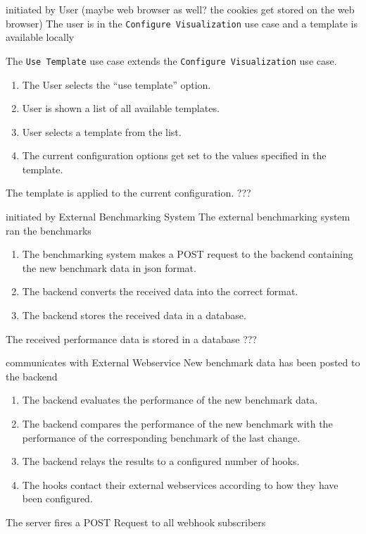 \bigskip

{initiated by User (maybe web browser as well? the cookies get stored on the web browser)}
{The user is in the \texttt{Configure Visualization} use case and a \gls{template} is available locally}
{The \texttt{Use Template} use case extends the \texttt{Configure Visualization} use case.
\begin{enumerate}
    \item The User selects the \enquote{use template} option.
    \item User is shown a list of all available \glspl{template}.
    \item User selects a \gls{template} from the list.
    \item The current \gls{configuration} options get set to the values specified in the template.
\end{enumerate}} 
{The \gls{template} is applied to the current configuration.}
{???}

\bigskip

{initiated by External Benchmarking System}
{The external benchmarking system ran the benchmarks}
{\begin{enumerate}
    \item The benchmarking system makes a POST request to the backend containing the new benchmark data in \acrshort{json} format.
    \item The backend converts the received data into the correct format.
    \item The backend stores the received data in a database.
\end{enumerate}} 
{The received performance data is stored in a database}
{???}

\bigskip

{communicates with External Webservice}
{New benchmark data has been posted to the backend}
{\begin{enumerate}
    \item The backend evaluates the performance of the new benchmark data.
    \item The backend compares the performance of the new benchmark with the performance of the corresponding benchmark of the last change.
    \item The backend relays the results to a configured number of hooks.
    \item The hooks contact their external webservices according to how they have been configured.
\end{enumerate}}
{The server fires a POST Request to all webhook subscribers}
{}

